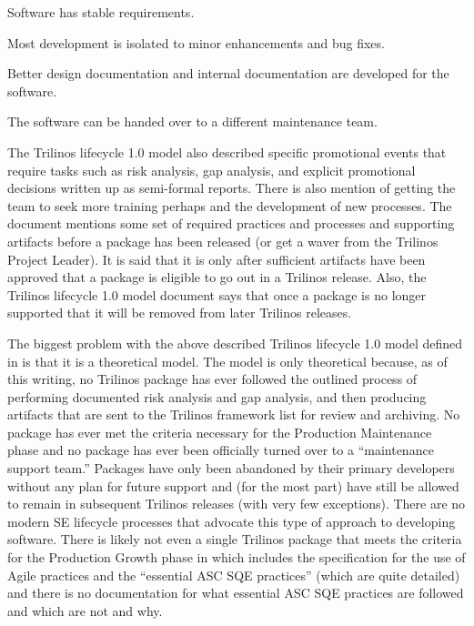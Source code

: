 \documentclass[11pt]{SANDreport}
\begin{document}
\begin{compactitem}
\begin{compactitem}
  {}\item Software has stable requirements.

  {}\item Most development is isolated to minor enhancements and bug
  fixes.

  {}\item Better design documentation and internal documentation are
  developed for the software.

  {}\item The software can be handed over to a different maintenance
  team.
  
  \end{compactitem}

\end{compactitem}

The Trilinos lifecycle 1.0 model also described specific promotional
events that require tasks such as risk analysis, gap analysis, and
explicit promotional decisions written up as semi-formal reports.
There is also mention of getting the team to seek more training
perhaps and the development of new processes.  The document
{}\cite{TrilinosLifecycleModel2007} mentions some set of required
practices and processes and supporting artifacts before a package has
been released (or get a waver from the Trilinos Project Leader).  It
is said that it is only after sufficient artifacts have been approved
that a package is eligible to go out in a Trilinos release.  Also, the
Trilinos lifecycle 1.0 model document says that once a package is no
longer supported that it will be removed from later Trilinos releases.

The biggest problem with the above described Trilinos lifecycle 1.0
model defined in {}\cite{TrilinosLifecycleModel2007} is that it is a
theoretical model.  The model is only theoretical because, as of this
writing, no Trilinos package has ever followed the outlined process of
performing documented risk analysis and gap analysis, and then
producing artifacts that are sent to the Trilinos framework list for
review and archiving.  No package has ever met the criteria necessary
for the Production Maintenance phase and no package has ever been
officially turned over to a ``maintenance support team.''  Packages
have only been abandoned by their primary developers without any plan
for future support and (for the most part) have still be allowed to
remain in subsequent Trilinos releases (with very few exceptions).
There are no modern SE lifecycle processes that advocate this type of
approach to developing software.  There is likely not even a single
Trilinos package that meets the criteria for the Production Growth
phase in {}\cite{TrilinosLifecycleModel2007} which includes the
specification for the use of Agile practices and the ``essential ASC
SQE practices'' (which are quite detailed) and there is no
documentation for what essential ASC SQE practices are followed and
which are not and why.
\end{document}
